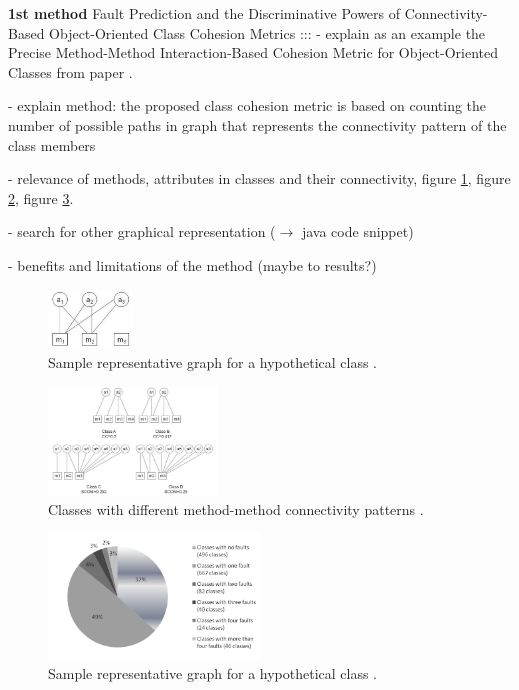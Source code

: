 \textbf{1st method} Fault Prediction and the Discriminative Powers of Connectivity-Based
Object-Oriented Class Cohesion Metrics \cite{b8al2012precise} ::: 
- explain as an example the Precise Method-Method Interaction-Based Cohesion Metric for Object-Oriented Classes from paper \cite{b8al2012precise}.

- explain method: the proposed class cohesion metric is based on counting the number of possible paths in graph that represents the connectivity pattern of the class members

- relevance of methods, attributes in classes and their connectivity, figure \ref{fig1}, figure \ref{fig2}, figure \ref{fig3}.

- search for other graphical representation ($\rightarrow$ java code snippet)

- benefits and limitations of the method (maybe to results?)


\begin{figure}[htbp]
	\centerline{\includegraphics[width=0.2\textwidth]{pictures/am.png}}
	\caption{Sample representative graph for a hypothetical class \cite{b3al2012fault}.}
	\label{fig1}
\end{figure}

\begin{figure}[htbp]
	\centerline{\includegraphics[width=0.4\textwidth]{pictures/am2.png}}
	\caption{Classes with different method-method connectivity patterns \cite{b3al2012fault}.}
	\label{fig2}
\end{figure}

\begin{figure}[htbp]
	\centerline{\includegraphics[width=0.5\textwidth]{pictures/circle.png}}
	\caption{Sample representative graph for a hypothetical class \cite{b3al2012fault}.}
	\label{fig3}
\end{figure}


